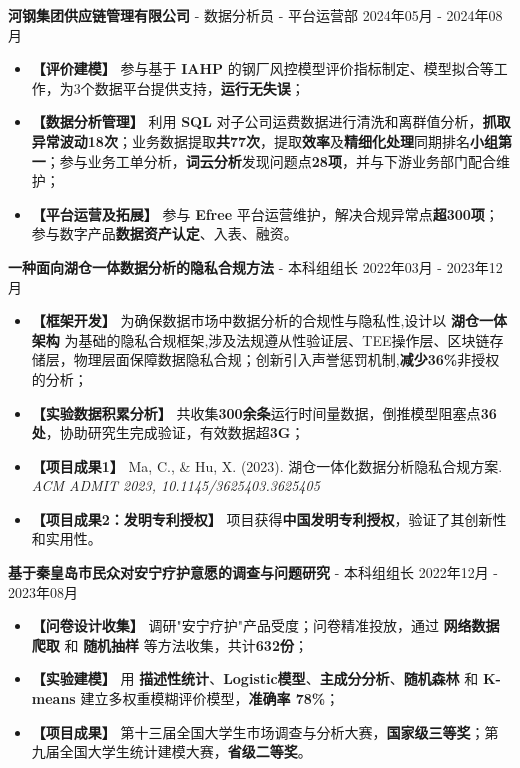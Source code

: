 \documentclass[10pt,a4paper]{article}
\newcommand{\cvsection}[2]{
  \vspace{0.6ex}
  \noindent{\color{myblue}\Large\bfseries\faIcon{#1}\hspace{0.5em}#2} \textcolor{myblue!50}{\hrulefill}\par
  \vspace{0.3ex}
}
\begin{document}
{\fontsize{12pt}{14.4pt}\selectfont\noindent\textbf{河钢集团供应链管理有限公司} - 数据分析员 - 平台运营部 \hfill 2024年05月 - 2024年08月\par}
\begin{itemize}[leftmargin=1em, label=, itemsep=0.35ex, topsep=0.05ex]
\item \textbf{【评价建模】} 参与基于 \textbf{IAHP} 的钢厂风控模型评价指标制定、模型拟合等工作，为3个数据平台提供支持，\textbf{运行无失误}；
\item \textbf{【数据分析管理】} 利用 \textbf{SQL} 对子公司运费数据进行清洗和离群值分析，\textbf{抓取异常波动18次}；业务数据提取\textbf{共77次}，提取\textbf{效率}及\textbf{精细化处理}同期排名\textbf{小组第一}；参与业务工单分析，\textbf{词云分析}发现问题点\textbf{28项}，并与下游业务部门配合维护；
\item \textbf{【平台运营及拓展】} 参与 \textbf{Efree} 平台运营维护，解决合规异常点\textbf{超300项}；参与数字产品\textbf{数据资产认定}、入表、融资。
\end{itemize}

\cvsection{star}{项目比赛经历}

{\fontsize{12pt}{14.4pt}\selectfont\noindent\textbf{一种面向湖仓一体数据分析的隐私合规方法} - 本科组组长 \hfill 2022年03月 - 2023年12月\par}
\begin{itemize}[leftmargin=1em, label=, itemsep=0.35ex, topsep=0.05ex]
\item \textbf{【框架开发】} 为确保数据市场中数据分析的合规性与隐私性,设计以 \textbf{湖仓一体架构} 为基础的隐私合规框架,涉及法规遵从性验证层、TEE操作层、区块链存储层，物理层面保障数据隐私合规；创新引入声誉惩罚机制,\textbf{减少36\%}非授权的分析；
\item \textbf{【实验数据积累分析】} 共收集\textbf{300余条}运行时间量数据，倒推模型阻塞点\textbf{36处}，协助研究生完成验证，有效数据超\textbf{3G}；
\item \textbf{【项目成果1】} Ma, C., \& Hu, X. (2023). 湖仓一体化数据分析隐私合规方案. \textit{ACM ADMIT 2023, 10.1145/3625403.3625405}
\item \textbf{【项目成果2：发明专利授权】} 项目获得\textbf{中国发明专利授权}，验证了其创新性和实用性。
\end{itemize}
\vspace{0.3ex}

{\fontsize{12pt}{14.4pt}\selectfont\noindent\textbf{基于秦皇岛市民众对安宁疗护意愿的调查与问题研究} - 本科组组长 \hfill 2022年12月 - 2023年08月\par}
\begin{itemize}[leftmargin=1em, label=, itemsep=0.35ex, topsep=0.05ex]
\item \textbf{【问卷设计收集】} 调研"安宁疗护"产品受度；问卷精准投放，通过 \textbf{网络数据爬取} 和 \textbf{随机抽样} 等方法收集，共计\textbf{632份}；
\item \textbf{【实验建模】} 用 \textbf{描述性统计}、\textbf{Logistic模型}、\textbf{主成分分析}、\textbf{随机森林} 和 \textbf{K-means} 建立多权重模糊评价模型，\textbf{准确率 78\%}；
\item \textbf{【项目成果】} 第十三届全国大学生市场调查与分析大赛，\textbf{国家级三等奖}；第九届全国大学生统计建模大赛，\textbf{省级二等奖}。
\end{itemize}
\end{document}
